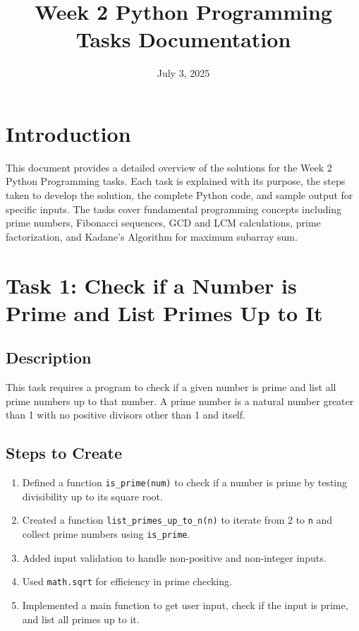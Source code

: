 \documentclass[a4paper,12pt]{article}
\title{Week 2 Python Programming Tasks Documentation}
\author{}
\date{July 3, 2025}
\begin{document}
\maketitle

\section*{Introduction}
This document provides a detailed overview of the solutions for the Week 2 Python Programming tasks. Each task is explained with its purpose, the steps taken to develop the solution, the complete Python code, and sample output for specific inputs. The tasks cover fundamental programming concepts including prime numbers, Fibonacci sequences, GCD and LCM calculations, prime factorization, and Kadane's Algorithm for maximum subarray sum.

\section{Task 1: Check if a Number is Prime and List Primes Up to It}
\subsection{Description}
This task requires a program to check if a given number is prime and list all prime numbers up to that number. A prime number is a natural number greater than 1 with no positive divisors other than 1 and itself.

\subsection{Steps to Create}
\begin{enumerate}
    \item Defined a function \texttt{is\_prime(num)} to check if a number is prime by testing divisibility up to its square root.
    \item Created a function \texttt{list\_primes\_up\_to\_n(n)} to iterate from 2 to \texttt{n} and collect prime numbers using \texttt{is\_prime}.
    \item Added input validation to handle non-positive and non-integer inputs.
    \item Used \texttt{math.sqrt} for efficiency in prime checking.
    \item Implemented a main function to get user input, check if the input is prime, and list all primes up to it.
\end{enumerate}
\end{document}
